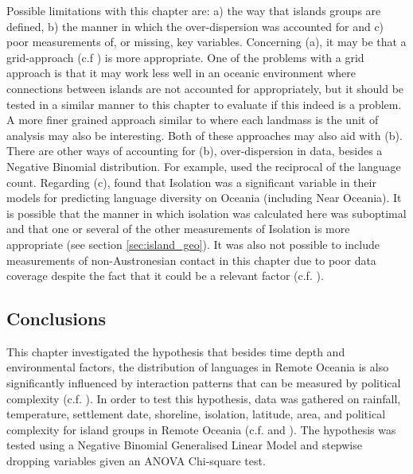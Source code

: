 \documentclass[a4paper,10pt]{article} %
\begin{document}
Possible limitations with this chapter are: a) the way that islands groups are defined, b) the manner in which the over-dispersion was accounted for and c) poor measurements of, or missing, key variables. Concerning (a), it may be that a grid-approach (c.f \citet{hua2019ecological}) is more appropriate. One of the problems with a grid approach is that it may work less well in an oceanic environment where connections between islands are not accounted for appropriately, but it should be tested in a similar manner to this chapter to evaluate if this indeed is a problem. A more finer grained approach similar to  \citet{gavin2012island} where each landmass is the unit of analysis may also be interesting. Both of these approaches may also aid with (b). There are other ways of accounting for (b), over-dispersion in data, besides a Negative Binomial distribution. For example, \citet[4-5]{gavin2012island} used the reciprocal of the language count. Regarding (c), \citet[4-5]{gavin2012island} found that Isolation was a significant variable in their models for predicting language diversity on Oceania (including Near Oceania). It is possible that the manner in which isolation was calculated here was suboptimal and that one or several of the other measurements of Isolation is more appropriate (see section \ref{sec:island_geo}). It was also not possible to include measurements of non-Austronesian contact in this chapter due to poor data coverage despite the fact that it could be a relevant factor (c.f. \citet{lipson_harvad_ancient_dna_vanuatu_2018, posth_jena_ancient_dna_vanuatu_2018}). 
 


\subsection{Conclusions}
This chapter investigated the hypothesis that besides time depth and environmental factors, the distribution of languages in Remote Oceania is also significantly influenced by interaction patterns that can be measured by political complexity (c.f. \citet{pawley81, pawley2007}). In order to test this hypothesis, data was gathered on rainfall, temperature, settlement date, shoreline, isolation, latitude, area, and political complexity for island groups in Remote Oceania (c.f. \citet{curriemace2009, gavin2012island, hua2019ecological} and \citet{Pacheco_Coelho_2019}). The hypothesis was tested using a Negative Binomial Generalised Linear Model and stepwise dropping variables given an ANOVA Chi-square test.
\end{document}
